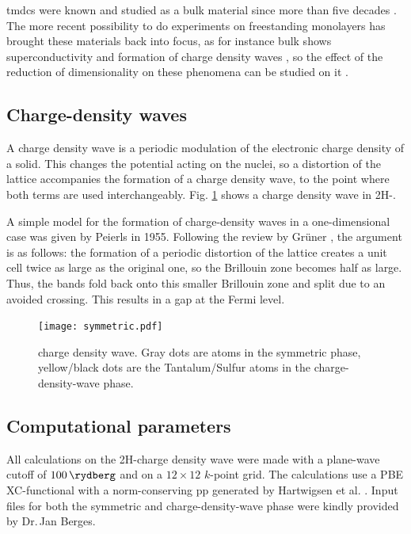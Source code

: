 \documentclass[main.tex]{subfiles}
\begin{document}
\acrshort{tmdc}s were known and studied as a bulk material since more than five decades \cite{wilson_transition_1969}.
The more recent possibility to do experiments on freestanding monolayers \cite{novoselov_two-dimensional_2005} has brought these materials back into focus,  as for instance bulk \TaS shows superconductivity \cite{nagata_superconductivity_1992} and formation of charge density waves \cite{wilson_charge-density_1974}, so the effect of the reduction of dimensionality on these phenomena can be studied on it \cite{navarro-moratalla_enhanced_2016,hall_environmental_2019}.

\subsection{Charge-density waves}

A charge density wave is a periodic modulation of the electronic charge density of a solid.
This changes the potential acting on the nuclei, so a distortion of the lattice accompanies the formation of a charge density wave, to the point where both terms are used interchangeably.
Fig. \ref{fig:tas2_cdw_structure} shows a charge density wave in 2H-\TaS.

A simple model for the formation of charge-density waves in a one-dimensional case was given by Peierls in 1955.
Following the review by Grüner \cite{gruner_dynamics_1988}, the argument is as follows: 
the formation of a periodic distortion of the lattice creates a unit cell twice as large as the original one, so the Brillouin zone becomes half as large.
Thus, the bands fold back onto this smaller Brillouin zone and split due to an avoided crossing.
This results in a gap at the Fermi level.

\begin{figure}[h]
    \centering
    \texttt{[image: symmetric.pdf]}
    \caption{\TaS charge density wave. Gray dots are atoms in the symmetric phase, yellow/black dots are the Tantalum/Sulfur atoms in the charge-density-wave phase.}
    \label{fig:tas2_cdw_structure}
\end{figure}


\subsection{Computational parameters}

All calculations on the 2H-\TaS charge density wave were made with a plane-wave cutoff of \(\SI{100}{\rydberg}\) and on a \(12\times12\) \(k\)-point grid.
The calculations use a PBE XC-functional with a norm-conserving \acrshort{pp} generated by Hartwigsen et al. \cite{hartwigsen_relativistic_1998}.
Input files for both the symmetric and charge-density-wave phase were kindly provided by Dr.\,Jan Berges.
\end{document}
